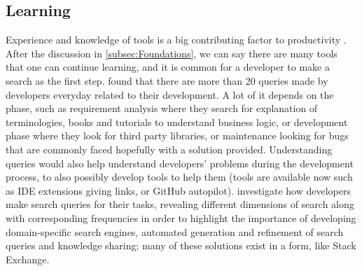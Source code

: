 \documentclass{mprop}
\begin{document}
\subsection{Learning}

Experience and knowledge of tools is a big contributing factor to productivity \cite{gillProductivityImpactsSoftware1990,deomeloInterpretativeCaseStudies2013,maxwellBenchmarkingSoftwareDevelopmentProductivity2000,oliveiraSoftwareProjectManagers2016}. After the discussion in \ref{subsec:Foundations}, we can say there are many tools that one can continue learning, and it is common for a developer to make a search as the first step. \textcite{baoTrackingAnalyzingCrossCutting2015} found that there are more than 20 queries made by developers everyday related to their development. A lot of it depends on the phase, such as requirement analysis where they search for explanation of terminologies, books and tutorials to understand business logic, or development phase where they look for third party libraries, or maintenance looking for bugs that are commonly faced hopefully with a solution provided. Understanding queries would also help understand developers' problems during the development process, to also possibly develop tools to help them (tools are available now such as IDE extensions giving links, or GitHub autopilot). \textcite{simArchetypalSourceCode1998,stoleeSolvingSearchSource2014,sadowskiHowDevelopersSearch2015,bajracharyaMiningSearchTopics2009,bajracharyaAnalyzingMiningCode2012,xia2017developers} investigate how developers make search queries for their tasks, revealing different dimensions of search along with corresponding frequencies in order to highlight the importance of developing domain-specific search engines, automated generation and refinement of search queries and knowledge sharing; many of these solutions exist in a form, like Stack Exchange.
\end{document}
